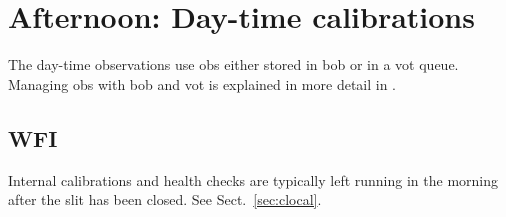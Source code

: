 \documentclass[11pt,fleqn,a4paper]{book}
\begin{document}
\chapter{Afternoon: Day-time calibrations}
\label{chap:daycal}

The day-time observations use \glspl{ob} either stored in \gls{bob} or in a
\gls{vot} queue.  Managing \glspl{ob} with \gls{bob} and \gls{vot} is
explained in more detail in .

\section{WFI}
Internal calibrations and health checks are typically left running in the morning after the \gls{slit} has been closed.  See Sect.~\ref{sec:clocal}.

\end{document}
